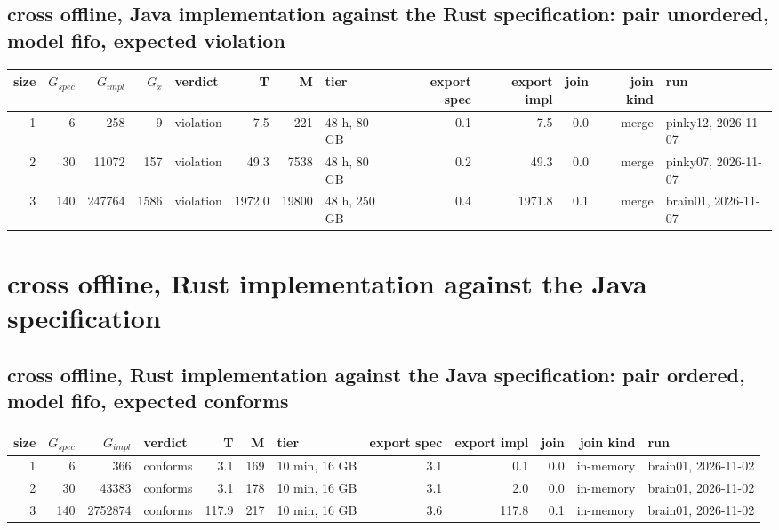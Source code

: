 \documentclass[10pt]{article}
\begin{document}
\subsection*{cross offline, Java implementation against the Rust specification: pair \textsf{unordered}, model fifo, expected violation}
\begin{longtable}{@{}rrrrlrrlrrrrl@{}}
\toprule
size & $G_{\mathit{spec}}$ & $G_{\mathit{impl}}$ & $G_x$ & verdict & T & M & tier & export spec & export impl & join & join kind & run \\
\midrule
\endhead
\color{red} 1 & 6 & 258 & 9 & violation & 7.5 & 221 & 48 h, 80 GB & 0.1 & 7.5 & 0.0 & merge & pinky12, 2026-11-07 \\
\color{red} 2 & 30 & 11072 & 157 & violation & 49.3 & 7538 & 48 h, 80 GB & 0.2 & 49.3 & 0.0 & merge & pinky07, 2026-11-07 \\
\color{blue} 3 & 140 & 247764 & 1586 & violation & 1972.0 & 19800 & 48 h, 250 GB & 0.4 & 1971.8 & 0.1 & merge & brain01, 2026-11-07 \\
\bottomrule
\end{longtable}
\section*{cross offline, Rust implementation against the Java specification}
\subsection*{cross offline, Rust implementation against the Java specification: pair \textsf{ordered}, model fifo, expected conforms}
\begin{longtable}{@{}rrrlrrlrrrrl@{}}
\toprule
size & $G_{\mathit{spec}}$ & $G_{\mathit{impl}}$ & verdict & T & M & tier & export spec & export impl & join & join kind & run \\
\midrule
\endhead
\color{red} 1 & 6 & 366 & conforms & 3.1 & 169 & 10 min, 16 GB & 3.1 & 0.1 & 0.0 & in-memory & brain01, 2026-11-02 \\
\color{red} 2 & 30 & 43383 & conforms & 3.1 & 178 & 10 min, 16 GB & 3.1 & 2.0 & 0.0 & in-memory & brain01, 2026-11-02 \\
\color{red} 3 & 140 & 2752874 & conforms & 117.9 & 217 & 10 min, 16 GB & 3.6 & 117.8 & 0.1 & in-memory & brain01, 2026-11-02 \\
\bottomrule
\end{longtable}
\end{document}
